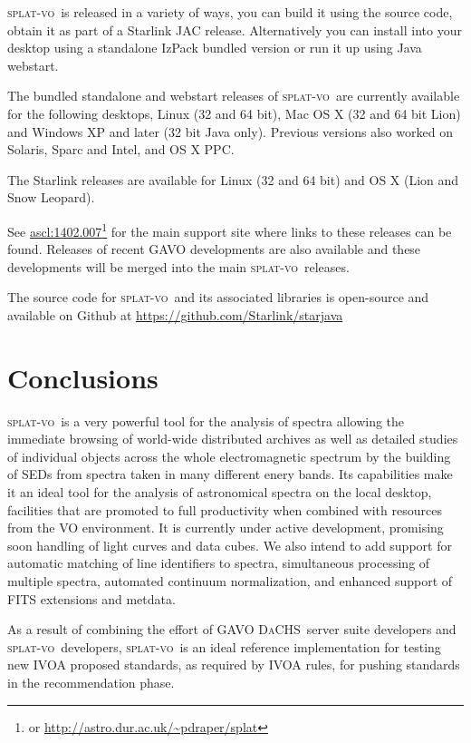 \documentclass[final,authoryear,5p,times,twocolumn]{elsarticle}
\newcommand{\splatvo}{\textsc{splat-vo}}
\newcommand{\dachs}{\textsc{DaCHS}}
\newcommand{\ascl}[1]{\href{http://www.ascl.net/#1}{ascl:#1}}
\begin{document}
\splatvo\ is released in a variety of ways, you can build it using the source
code, obtain it as part of a Starlink JAC release. Alternatively you can
install into your desktop using a standalone IzPack bundled version or run it
up using Java webstart.

The bundled standalone and webstart releases of \splatvo\ are currently
available for the following desktops, Linux (32 and 64 bit), Mac OS X (32 and
64 bit Lion) and Windows XP and later (32 bit Java only). Previous versions
also worked on Solaris, Sparc and Intel, and OS X PPC.

The Starlink releases
\citep[e.g.,][]{currie_adassxxiii,2013ASPC..475..247B} are available
for Linux (32 and 64 bit) and OS X (Lion and Snow Leopard).

See \ascl{1402.007}\footnote{or \url{http://astro.dur.ac.uk/~pdraper/splat}}
for the main support site where links to these releases can be found.
Releases of recent GAVO developments are also available and these
developments will be merged into the main \splatvo\ releases.

The source code for \splatvo\ and its associated libraries is
open-source and available on Github at
\url{https://github.com/Starlink/starjava}


\section{Conclusions}

\splatvo\ is a very powerful tool for the analysis of spectra allowing the
immediate browsing of world-wide distributed archives as well as detailed
studies of individual objects across the whole electromagnetic spectrum by the
building of SEDs from spectra taken in many different enery bands. Its
capabilities make it an ideal tool for the analysis of astronomical spectra on
the local desktop, facilities that are promoted to full productivity when
combined with resources from the VO environment. It is currently under active
development, promising soon handling of light curves and data cubes. We
also intend to add support for automatic matching of line identifiers to
spectra, simultaneous processing of multiple spectra, automated continuum
normalization, and enhanced support of FITS extensions and metdata.

As a result of combining the effort of GAVO \dachs\ server suite
developers and \splatvo\ developers, \splatvo\ is an ideal reference
implementation for testing new IVOA proposed standards, as required by
IVOA rules, for pushing standards in the recommendation phase.
\end{document}
